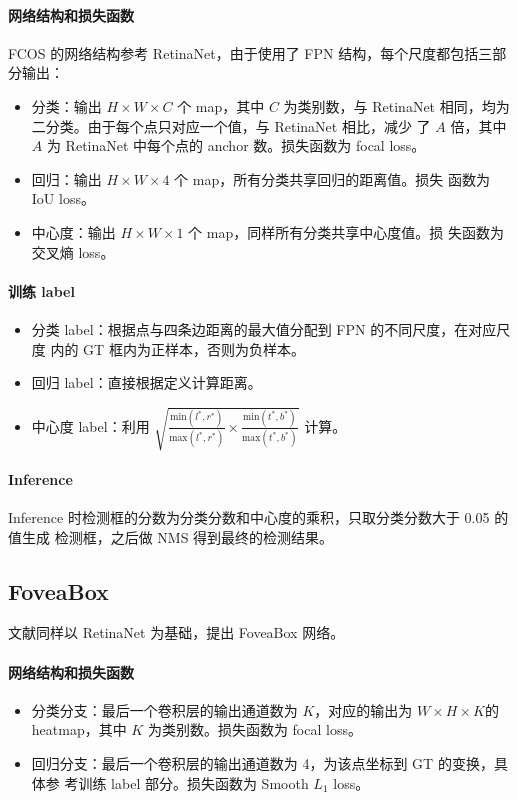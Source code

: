 \paragraph{网络结构和损失函数}
FCOS 的网络结构参考 RetinaNet，由于使用了 FPN 结构，每个尺度都包括三部分输出：
\begin{itemize}
  \item 分类：输出 $H \times W \times C$ 个 map，其中 $C$ 为类别数，与
    RetinaNet 相同，均为二分类。由于每个点只对应一个值，与 RetinaNet 相比，减少
    了 $A$ 倍，其中 $A$ 为 RetinaNet 中每个点的 anchor 数。损失函数为 focal loss。
  \item 回归：输出 $H \times W \times 4$ 个 map，所有分类共享回归的距离值。损失
    函数为 IoU loss。
  \item 中心度：输出 $H \times W \times 1$ 个 map，同样所有分类共享中心度值。损
    失函数为交叉熵 loss。
\end{itemize}

\paragraph{训练 label}
\begin{itemize}
  \item 分类 label：根据点与四条边距离的最大值分配到 FPN 的不同尺度，在对应尺度
    内的 GT 框内为正样本，否则为负样本。
  \item 回归 label：直接根据定义计算距离。
  \item 中心度 label：利用 $\sqrt{\frac{\mathrm{min}(l^*,
        r^*)}{\mathrm{max}(l^*, r^*)} \times \frac{\mathrm{min}(t^*,
        b^*)}{\mathrm{max}(t^*, b^*)}}$ 计算。
\end{itemize}

\paragraph{Inference}
Inference 时检测框的分数为分类分数和中心度的乘积，只取分类分数大于 0.05 的值生成
检测框，之后做 NMS 得到最终的检测结果。

\subsection{FoveaBox}
文献同样以 RetinaNet 为基础，提出 FoveaBox 网络。 

\paragraph{网络结构和损失函数}
\begin{itemize}
  \item 分类分支：最后一个卷积层的输出通道数为 $K$，对应的输出为 $W \times H
    \times K$的 heatmap，其中 $K$ 为类别数。损失函数为 focal loss。
  \item 回归分支：最后一个卷积层的输出通道数为 4，为该点坐标到 GT 的变换，具体参
    考训练 label 部分。损失函数为 Smooth $L_1$ loss。
\end{itemize}

